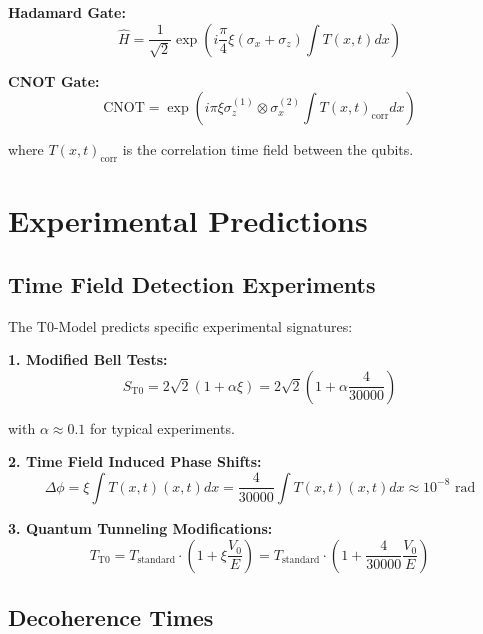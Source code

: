 \documentclass[12pt,a4paper]{report}
\newcommand{\Tfield}{T(x,t)}  %
\newcommand{\xipar}{\xi}      %
\begin{document}
	\textbf{Hadamard Gate:}
	\begin{equation}
		\hat{H} = \frac{1}{\sqrt{2}} \exp\left(i\frac{\pi}{4} \xipar (\sigma_x + \sigma_z) \int \Tfield dx\right)
	\end{equation}
	
	\textbf{CNOT Gate:}
	\begin{equation}
		\text{CNOT} = \exp\left(i\pi \xipar \sigma_z^{(1)} \otimes \sigma_x^{(2)} \int \Tfield_{\text{corr}} dx\right)
	\end{equation}
	
	where $\Tfield_{\text{corr}}$ is the correlation time field between the qubits.
	
	\section{Experimental Predictions}\label{sec:experimental_predictions}
	
	\subsection{Time Field Detection Experiments}\label{subsec:timefield_detection}
	
	The T0-Model predicts specific experimental signatures:
	
	\textbf{1. Modified Bell Tests:}
	\begin{equation}
		S_{\text{T0}} = 2\sqrt{2} \left(1 + \alpha \xipar\right) = 2\sqrt{2} \left(1 + \alpha \frac{4}{30000}\right)
	\end{equation}
	
	with $\alpha \approx 0.1$ for typical experiments.
	
	\textbf{2. Time Field Induced Phase Shifts:}
	\begin{equation}
		\Delta \phi = \xipar \int \Tfield(x,t) dx = \frac{4}{30000} \int \Tfield(x,t) dx \approx 10^{-8} \text{ rad}
	\end{equation}
	
	\textbf{3. Quantum Tunneling Modifications:}
	\begin{equation}
		T_{\text{T0}} = T_{\text{standard}} \cdot \left(1 + \xipar \frac{V_0}{E}\right) = T_{\text{standard}} \cdot \left(1 + \frac{4}{30000} \frac{V_0}{E}\right)
	\end{equation}
	
	\subsection{Decoherence Times}\label{subsec:decoherence_times}
	
\end{document}
